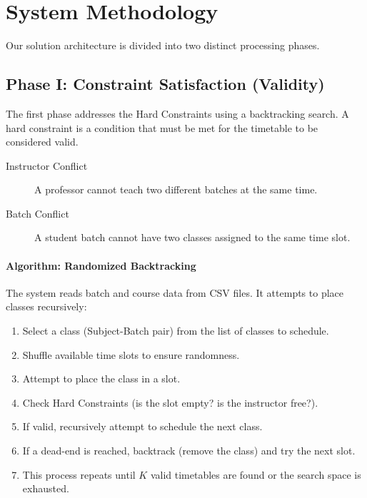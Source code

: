\documentclass[a4paper,twoside,11pt]{article}
\begin{document}
    \section{System Methodology}
        Our solution architecture is divided into two distinct processing phases.

        \subsection{Phase I: Constraint Satisfaction (Validity)}
            The first phase addresses the Hard Constraints using a backtracking search. A hard constraint is a condition that must be met for the timetable to be considered valid.

            \begin{description}
                \item[Instructor Conflict] A professor cannot teach two different batches at the same time.
                \item[Batch Conflict] A student batch cannot have two classes assigned to the same time slot.
            \end{description}

            \paragraph{Algorithm: Randomized Backtracking}
                The system reads batch and course data from CSV files. It attempts to place classes recursively:
                \begin{enumerate}
                    \itemsep0em
                    \item Select a class (Subject-Batch pair) from the list of classes to schedule.
                    \item Shuffle available time slots to ensure randomness.
                    \item Attempt to place the class in a slot.
                    \item Check Hard Constraints (is the slot empty? is the instructor free?).
                    \item If valid, recursively attempt to schedule the next class.
                    \item If a dead-end is reached, backtrack (remove the class) and try the next slot.
                    \item This process repeats until $K$ valid timetables are found or the search space is exhausted.
                \end{enumerate}
        
\end{document}
